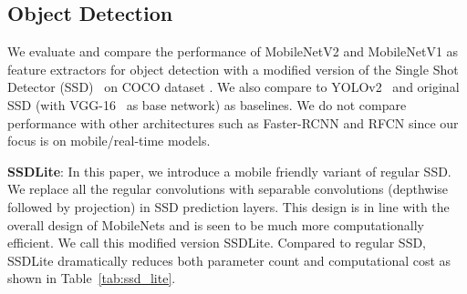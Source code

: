 \documentclass[10pt,twocolumn,letterpaper]{article}
\begin{document}
\begin{table}[b]
    \centering 
    \caption{
        Performance on \mbox{ImageNet}, comparison for different networks.
        As is common practice for ops, we count the total number of Multiply-Adds.
        In the last column we report running time in milliseconds (ms) for a single large core of the Google \mbox{Pixel 1} phone (using \mbox{TF-Lite}).
        We do not report \mbox{ShuffleNet} numbers as  efficient group convolutions and shuffling are not yet supported.
    }
    \label{table:performance-comparison}
\end{table}

\subsection{Object Detection}
We evaluate and compare the performance of \mbox{MobileNetV2} and \mbox{MobileNetV1} as feature extractors \cite{huang2016speed} for object detection with a modified version of the Single Shot Detector (SSD)~\cite{liu2016ssd} on \mbox{COCO} dataset \cite{COCO}.
We also compare to \mbox{YOLOv2}~\cite{redmon2016yolo9000} and original SSD (with VGG-16~\cite{VGGNet} as base network) as baselines.
We do not compare performance with other architectures such as \mbox{Faster-RCNN} \cite{ren2015faster} and RFCN \cite{dai2016rfcn} since our focus is on mobile/real-time models.

\textbf{SSDLite}: In this paper, we introduce a mobile friendly variant of regular SSD. We replace all the regular convolutions with separable convolutions (depthwise followed by  projection) in SSD prediction layers.
This design is in line with the overall design of \mbox{MobileNets} and is seen to be much more computationally efficient.
We call this modified version \mbox{SSDLite}.
Compared to regular SSD, \mbox{SSDLite} dramatically reduces both parameter count and computational cost as shown in Table~\ref{tab:ssd_lite}.
\end{document}
